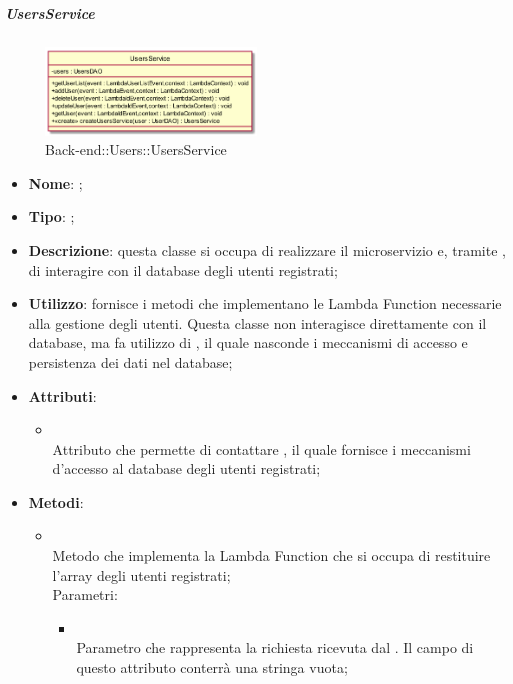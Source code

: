 \hypertarget{UsersService_label}{\subparagraph{UsersService}}
\begin{figure}[h]
	\centering
	\includegraphics[width=0.50\textwidth,height=\textheight,keepaspectratio]{images/ClassUsersService.png}
	\caption{Back-end::Users::UsersService}
\end{figure}
\begin{itemize}
	\item \textbf{Nome}: ;
	\item \textbf{Tipo}: ;
	\item \textbf{Descrizione}: questa classe si occupa di realizzare il microservizio  e, tramite , di interagire con il database degli utenti registrati;
	\item \textbf{Utilizzo}: fornisce i metodi che implementano le Lambda Function necessarie alla gestione degli utenti.
Questa classe non interagisce direttamente con il database, ma fa utilizzo di , il quale nasconde i meccanismi di accesso e persistenza dei dati nel database;
	\item \textbf{Attributi}:
	\begin{itemize}
		\item[]  \\
		Attributo che permette di contattare , il quale fornisce i meccanismi d'accesso al database degli utenti registrati;
	\end{itemize}
	\item \textbf{Metodi}:
	\begin{itemize}
		\item[]  \\		Metodo che implementa la Lambda Function che si occupa di restituire l'array degli utenti registrati;\\
		Parametri:
		\begin{itemize}
			\item {} \\
			Parametro che rappresenta la richiesta ricevuta dal . Il campo  di questo attributo conterrà una stringa vuota;

\end{itemize}
\end{itemize}
\end{itemize}
